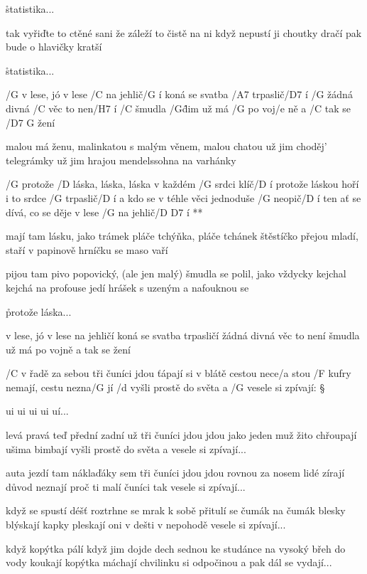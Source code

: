 \r statistika...

tak vyřiďte to ctěné sani
že záleží to čistě na ni
když nepustí ji choutky dračí
pak bude o hlavičky kratší

\r statistika...




/G v lese, jó v lese /C na jehlič/G í
koná se svatba /A7 trpaslič/D7 í
/G žádná divná /C věc to nen/H7 í
/C šmudla /G\^{dim} už má /G po voj/e ně a /C tak se /{D7 G} žení \s

malou má ženu, malinkatou
s malým věnem, malou chatou
už jim choděj' telegrámky
už jim hrajou mendelssohna na varhánky

\R  /G protože /D láska, láska, láska v každém /G srdci klíč/D í
    protože láskou hoří i to srdce /G trpaslič/D í
    a kdo se v téhle věci jednoduše /G neopič/D í
    ten ať se dívá, co se děje v lese /G na jehlič/{D D7} í **

mají tam lásku, jako trámek
pláče tchýňka, pláče tchánek
štěstíčko přejou mladí, staří
v papinově hrníčku se maso vaří \s

pijou tam pivo popovický, (ale jen malý)
šmudla se polil, jako vždycky
kejchal kejchá na profouse
jedí hrášek s uzeným a nafouknou se

\r protože láska...

v lese, jó v lese na jehličí
koná se svatba trpasličí
žádná divná věc to není
šmudla už má po vojně a tak se žení




/C v řadě za sebou tři čuníci jdou
ťápají si v blátě cestou nece/a stou
/F kufry nemají, cestu nezna/G jí
/d vyšli prostě do světa a /G vesele si zpívají: \S

ui ui ui ui uí... \s

levá pravá teď přední zadní už
tři čuníci jdou jdou jako jeden muž
žito chřoupají ušima bimbají
vyšli prostě do světa a vesele si zpívají... \s

auta jezdí tam náklaďáky sem
tři čuníci jdou jdou rovnou za nosem
lidé zírají důvod neznají
proč ti malí čuníci tak vesele si zpívají... \s

když se spustí déšť roztrhne se mrak
k sobě přitulí se čumák na čumák
blesky blýskají kapky pleskají
oni v dešti v nepohodě vesele si zpívají... \s

když kopýtka pálí když jim dojde dech
sednou ke studánce na vysoký břeh
do vody koukají kopýtka máchají
chvilinku si odpočinou a pak dál se vydají... \s


